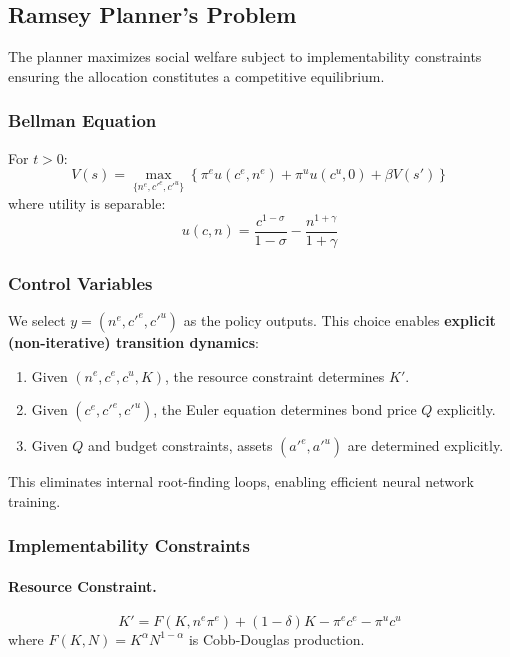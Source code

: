 \subsection{Ramsey Planner's Problem}

The planner maximizes social welfare subject to implementability constraints ensuring the allocation constitutes a competitive equilibrium.

\subsubsection{Bellman Equation}
For $t > 0$:
\begin{equation}\label{eq:bellman_ha}
    V(s) = \max_{\{n^e, c'^e, c'^u\}} \left\{ \pi^e u(c^e, n^e) + \pi^u u(c^u, 0) + \beta V(s') \right\}
\end{equation}
where utility is separable:
\begin{equation}
    u(c, n) = \frac{c^{1-\sigma}}{1-\sigma} - \frac{n^{1+\gamma}}{1+\gamma}
\end{equation}

\subsubsection{Control Variables}
We select $y = (n^e, c'^e, c'^u)$ as the policy outputs. This choice enables \textbf{explicit (non-iterative) transition dynamics}:
\begin{enumerate}
    \item Given $(n^e, c^e, c^u, K)$, the resource constraint determines $K'$.
    \item Given $(c^e, c'^e, c'^u)$, the Euler equation determines bond price $Q$ explicitly.
    \item Given $Q$ and budget constraints, assets $(a'^e, a'^u)$ are determined explicitly.
\end{enumerate}
This eliminates internal root-finding loops, enabling efficient neural network training.

\subsubsection{Implementability Constraints}

\paragraph{Resource Constraint.}
\begin{equation}\label{eq:resource_ha}
    K' = F(K, n^e \pi^e) + (1-\delta)K - \pi^e c^e - \pi^u c^u
\end{equation}
where $F(K, N) = K^\alpha N^{1-\alpha}$ is Cobb-Douglas production.

